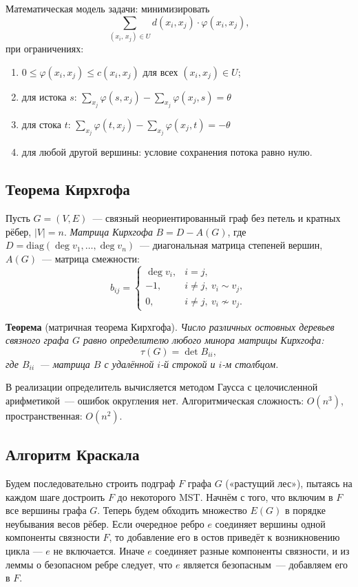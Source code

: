 Математическая модель задачи: минимизировать
\[
    \sum_{(x_i,\, x_j) \in U} d(x_i, x_j) \cdot \varphi(x_i, x_j),
\]
при ограничениях:

\begin{enumerate}
    \item $0 \leqslant \varphi(x_i, x_j) \leqslant c(x_i, x_j)$
          для всех $(x_i, x_j) \in U$;
    \item для истока $s$:
          $\displaystyle\sum_{x_j} \varphi(s, x_j) - \sum_{x_j} \varphi(x_j, s) = \theta$
    \item для стока $t$:
          $\displaystyle\sum_{x_j} \varphi(t, x_j) - \sum_{x_j} \varphi(x_j, t) = -\theta$
    \item для любой другой вершины: условие сохранения потока равно нулю.
\end{enumerate}

\subsection{Теорема Кирхгофа}

Пусть $G = (V, E)$~--- связный неориентированный граф без петель и кратных
рёбер, $|V| = n$. \textit{Матрица Кирхгофа} $B = D - A(G)$,
где $D = \mathrm{diag}(\deg v_1, \ldots, \deg v_n)$~--- диагональная матрица
степеней вершин, $A(G)$~--- матрица смежности:
\[
    b_{ij} =
    \begin{cases}
        \deg v_i, & i = j, \\
        -1,       & i \neq j,\ v_i \sim v_j, \\
        0,        & i \neq j,\ v_i \not\sim v_j.
    \end{cases}
\]

\textbf{Теорема} (матричная теорема Кирхгофа). \textit{Число различных
остовных деревьев связного графа $G$ равно определителю любого минора
матрицы Кирхгофа:}
\[
    \tau(G) = \det B_{ii},
\]
\textit{где $B_{ii}$~--- матрица $B$ с удалённой $i$-й строкой и $i$-м столбцом.}

В реализации определитель вычисляется методом Гаусса с целочисленной
арифметикой~--- ошибок округления нет.
Алгоритмическая сложность: $O(n^3)$, пространственная: $O(n^2)$.

\subsection{Алгоритм Краскала}

Будем последовательно строить подграф $F$ графа $G$ («растущий лес»),
пытаясь на каждом шаге достроить $F$ до некоторого MST. Начнём с того, что
включим в $F$ все вершины графа $G$. Теперь будем обходить множество $E(G)$
в порядке неубывания весов рёбер. Если очередное ребро $e$ соединяет вершины
одной компоненты связности $F$, то добавление его в остов приведёт к возникновению
цикла --- $e$ не включается. Иначе $e$ соединяет разные компоненты связности,
и из леммы о безопасном ребре следует, что $e$ является безопасным~--- добавляем
его в $F$.

